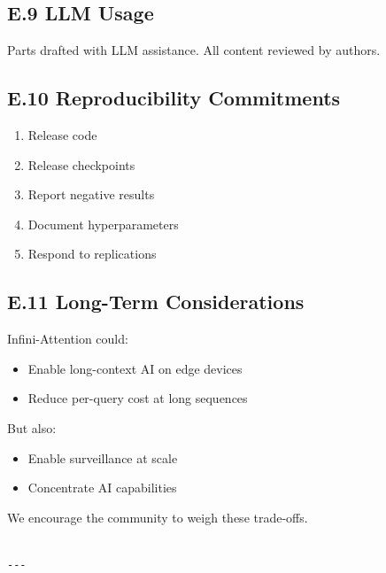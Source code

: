 \subsection{E.9 LLM Usage}

Parts drafted with LLM assistance. All content reviewed by authors.

\subsection{E.10 Reproducibility Commitments}

\begin{enumerate}
\item Release code
\item Release checkpoints
\item Report negative results
\item Document hyperparameters
\item Respond to replications

\end{enumerate}
\subsection{E.11 Long-Term Considerations}

Infini-Attention could:

\begin{itemize}
\item Enable long-context AI on edge devices
\item Reduce per-query cost at long sequences

\end{itemize}
But also:

\begin{itemize}
\item Enable surveillance at scale
\item Concentrate AI capabilities

\end{itemize}
We encourage the community to weigh these trade-offs.
\begin{lstlisting}

---
\end{lstlisting}